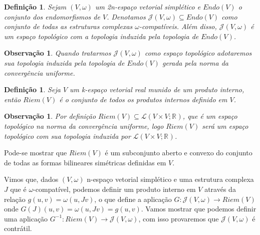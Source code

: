 \documentclass[12pt]{book}
\newtheorem{definicao}[teorema]{Definição}
\newtheorem{observacao}[teorema]{Observação}
\newcommand{\estruturacomplexapadrao}{\mathcal{J}(V, \omega)}
\newcommand{\produtosinternos}[1]{Riem(#1)}
\newcommand{\real}[1]{\mathbb{R}^{#1}}
\newcommand{\vermelho}[1]{{\color{red}#1}}
\begin{document}
	\begin{definicao} \label{definicao_conjunto_estrutura_complexa}
		Sejam $(V,\omega)$ um 2n-espaço vetorial simplético e $Endo(V)$ o conjunto dos endomorfismos de $V$. Denotamos $\estruturacomplexapadrao \subseteq Endo(V)$ como conjunto de todas as estruturas complexas $\omega$-compatíveis. Além disso, $\estruturacomplexapadrao$ é um espaço topológico com a topologia induzida pela topologia de $Endo(V)$.
	\end{definicao}
	
	\begin{observacao}\label{observacao_conjunto_estrutura_complexa}
		Quando tratarmos $\estruturacomplexapadrao$ como espaço topológico adotaremos sua topologia induzida pela topologia de $Endo(V)$ gerada pela norma da convergência uniforme.
	\end{observacao}

	\begin{definicao}
		Seja $V$ um k-espaço vetorial real munido de um produto interno, então $\produtosinternos{V}$ é o conjunto de todos os produtos internos definido em $V$.
	\end{definicao}
	
	\begin{observacao}
		Por definição $\produtosinternos{V} \subseteq \mathcal{L}(V \times V; \real{})$, que é um espaço topológico na norma da convergência uniforme, logo $\produtosinternos{V}$ será um espaço topológico com sua topologia induzida por $\mathcal{L}(V \times V; \real{})$.
	\end{observacao} 
	
	\vermelho{Pode-se mostrar que $\produtosinternos{V}$ é um subconjunto aberto e convexo do conjunto de todas as formas bilineares simétricas definidas em $V$}.
	
	Vimos que, dados $(V, \omega)$ n-espaço vetorial simplético e uma estrutura complexa $J$ que é $\omega$-compatível, podemos definir um produto interno em $V$ através da relação $g(u,v) = \omega(u,Jv)$, o que define a aplicação $G:\estruturacomplexapadrao \to \produtosinternos{V}$ onde $G(J)(u,v) = \omega(u,Jv) = g(u,v)$. Vamos mostrar que podemos definir uma aplicação $G^{-1}: \produtosinternos{V} \to \estruturacomplexapadrao$, com isso provaremos que $\estruturacomplexapadrao$ é contrátil.
	
\end{document}
